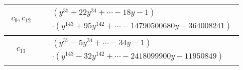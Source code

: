 \documentclass[1p]{elsarticle_modified}
\theoremstyle{definition}
\begin{document}
\begin{tabular}{m{50pt}|m{274pt}}
\hline $$\begin{aligned}c_{9},c_{12}\end{aligned}$$&$\begin{aligned}
&(y^{35}+22 y^{34}+\cdots-18 y-1)\\
&\cdot(y^{143}+95 y^{142}+\cdots-14790500680 y-364008241)
\end{aligned}$\\
\hline $$\begin{aligned}c_{11}\end{aligned}$$&$\begin{aligned}
&(y^{35}-5 y^{34}+\cdots-34 y-1)\\
&\cdot(y^{143}-32 y^{142}+\cdots-2418099900 y-11950849)
\end{aligned}$\\
\hline
\end{tabular}
\vskip 2pc
\end{document}
